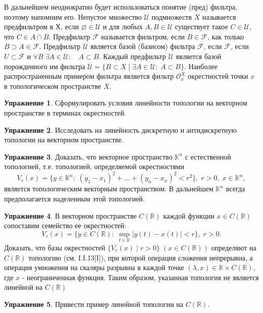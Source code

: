 \documentclass[a4paper, 12pt]{article}
\theoremstyle{definition}
\newtheorem{problem}{Упражнение}[section]
\theoremstyle{remark}
\begin{document}
В дальнейшем неоднократно будет использоваться понятие (пред) фильтра, поэтому напомним его.
Непустое множество $\mathcal{U} $ подмножеств $X$ называется предфильтром в Х, если $\varnothing\in \mathcal{U} $
и для любых $A, B \in \mathcal{U} $ существует такое $C\in \mathcal{U} $, что $C\in A\cap B$.
Предфильтр $\mathcal{F}$ называется фильтром, если $B\in \mathcal{F}$, как только $B \supset A \in \mathcal{F}$.
Предфильтр $\mathcal{U}$ является базой (базисом) фильтра $\mathcal{F}$, если $\mathcal{F}$,
если $U\subset \mathcal{F}$ и $\forall B\; \exists A\in \mathcal{U}: \quad A\subset B$. Каждый предфильтр
$\mathcal{U}$ является базой порожденного им фильтра $\overline{\mathcal{U}} = \{B\subset X \;|\; \exists A \in \mathcal{U}: \; A\subset B\}$.
Наиболее распространенным примером фильтра является фильтр $\mathcal{O}^X _x$ окрестностей
точки $x$ в топологическом пространстве $X$.
\begin{problem}
    Сформулировать условия линейности топологии на векторном пространстве в терминах окрестностей.
\end{problem}
\begin{problem}
    Исследовать на линейность дискретную и антидискретную топологии на векторном пространстве.
\end{problem}
\begin{problem}
    Доказать, что векторное пространство $\mathbb{K}^n$ с естественной топологией, т.е. топологией,
    определяемой окрестностями 
    \[V_r(x) = \{y\in \mathbb{K}^n:\; (y_1-x_1)^2 + \dots + (y_n -x_n)^2 < r^2\}, \; r >0, \; x\in \mathbb{K}^n,\]
    является топологическим векторным пространством. В дальнейшем $\mathbb{K}^n$ всегда
    предполагается наделенным этой топологией.
\end{problem}
\begin{problem}
    В векторном пространстве $C(\mathbb{R})$ каждой функции $x\in C(\mathbb{R})$ сопоставим семейство
    ее окрестностей:
    \[V_r(x) = \{y\in C(\mathbb{R}):\; \sup_{t\in\mathbb{R}}|y(t)-x(t)|<r \}, \; r >0.\]
    Доказать, что базы окрестностей $\{V_r(x)\;|\;r>0\}\; (x\in C(\mathbb{R}))$ определяют на $C(\mathbb{R})$
    топологию (см. I.I.13[I]), при которой операция сложения непрерывна, а операция умножения на скаляры
    разрывна в каждой точке $(\lambda, x)\in \mathbb{K}\times C(\mathbb{R})$, где $x$ - неограниченная функция.
    Таким образом, указанная топология не является линейной на $C(\mathbb{R})$
\end{problem}
\begin{problem}
    Привести пример линейной топологии на $C(\mathbb{R})$.
\end{problem}
\end{document}
